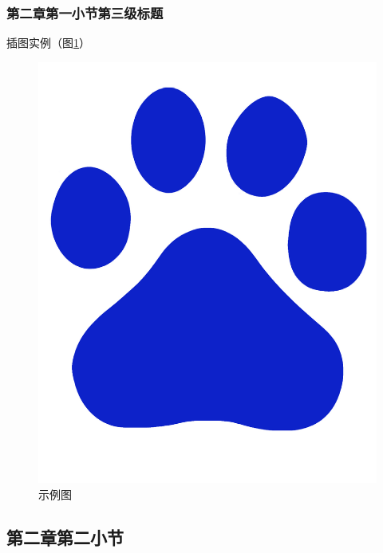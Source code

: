 \documentclass[twoside]{CUGThesis}
\begin{document}
	\subsubsection{第二章第一小节第三级标题}
	插图实例（图\ref{Fig:example}）
	\begin{figure}[!t]
		\centering
		\includegraphics[scale=0.5]{Figures/example.jpg}
		\caption{示例图}
		\label{Fig:example}
	\end{figure}
	\subsection{第二章第二小节}
\begin{table}[t]
	\centering
	\caption{在最短路问题中PL和ACO算法的比较}
	\label{Tab:ACOcomparison}
	\vspace{10mm}
\end{table}
\end{document}
